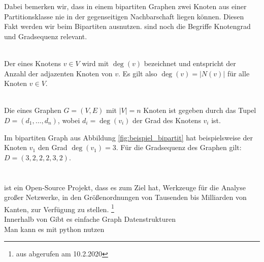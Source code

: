 \noindent
Dabei bemerken wir, dass in einem bipartiten Graphen zwei Knoten aus einer Partitionsklasse nie
in der gegenseitigen Nachbarschaft liegen können. Diesen Fakt werden wir beim Bipartiten \gc{} ausnutzen.
 sind noch die Begriffe Knotengrad und Gradsequenz relevant.
\begin{definition}[Knotengrad]~\\
Der  eines Knotens $v \in V$ wird mit $\deg(v)$ bezeichnet und entspricht der Anzahl
der adjazenten Knoten von $v$. Es gilt also $\deg(v) = |N(v)|$ für alle Knoten $v\in V$.
\end{definition}
\begin{definition}[Gradsequenz]~\\
Die  eines Graphen $G = (V,E)$ mit $|V| = n$ Knoten ist gegeben durch das Tupel
$D = (d_{1}, \dots, d_{n})$, wobei $d_{i} = \deg(v_{i})$ der Grad des Knotens $v_{i}$ ist.
\end{definition}
\noindent
Im bipartiten Graph aus Abbildung \ref{fig:beispiel_bipartit} hat beispielsweise
der Knoten $v_{1}$ den Grad $\deg(v_{1}) = 3$. Für die Gradsequenz des Graphen gilt: 
$D = (3,2,2,2,3,2)$.




\section{\nk}

 ist ein Open-Source Projekt, dass es zum Ziel hat, \glqq Werkzeuge für die
Analyse großer Netzwerke, in den Größenordnungen von Tausenden bis Milliarden 
von Kanten, zur Verfügung zu stellen\grqq{}.
\footnote{aus \cite{nk} abgerufen am 10.2.2020}
\\
Innerhalb von \nk Gibt es einfache Graph Datenstrukturen 
\\
Man kann es mit python nutzen 





